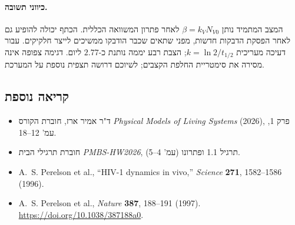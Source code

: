 \paragraph{כיווני תשובה.}
המצב המתמיד נותן $\beta=k_VN_{V0}$ לאחר פתרון המשוואה הכללית. הכתף יכולה להופיע גם לאחר הפסקת הדבקות חדשות, מפני שתאים שכבר הודבקו ממשיכים לייצר חלקיקים. עבור דעיכה מעריכית $k=\ln2/t_{1/2}$; הצבת רבע יממה נותנת כ-$2.77$ ליום. דגימה צפופה אינה מסירה את סימטריית החלפת הקצבים; לשיוכם דרושה תצפית נוספת על המערכת.

\subsection*{קריאה נוספת}
\begingroup\small
\begin{itemize}
\item ד"ר אמיר ארז, חוברת הקורס \emph{Physical Models of Living Systems} (2026), פרק 1, עמ' 12--18.
\item חוברת תרגילי הבית \emph{PMBS-HW2026}, תרגיל 1.1 ופתרונו (עמ' 4--5).
\item A.~S. Perelson et al., ``HIV-1 dynamics in vivo,'' \emph{Science} \textbf{271}, 1582--1586 (1996).
\item \textenglish{A.~S. Perelson et al., \emph{Nature} \textbf{387}, 188--191 (1997).}\\
\textenglish{\url{https://doi.org/10.1038/387188a0}}.
\end{itemize}
\endgroup

